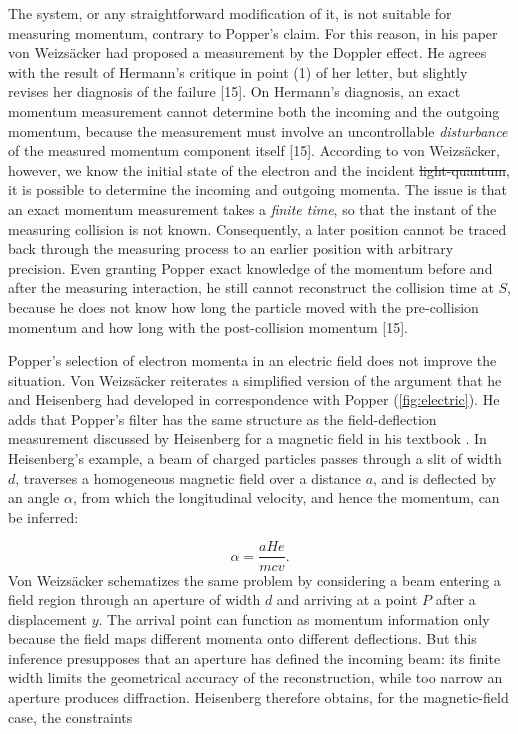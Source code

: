 \documentclass[pdflatex]{sn-jnl}
\newcommand{\vW}{von Weizsäcker\xspace}
\newcommand{\VW}{Von Weizsäcker\xspace}
\providecommand{\DIFadd}[1]{{\protect\color{blue}\uwave{#1}}} %
\providecommand{\DIFdel}[1]{{\protect\color{red}\sout{#1}}}                      %
\providecommand{\DIFaddbegin}{} %
\providecommand{\DIFaddend}{} %
\providecommand{\DIFdelbegin}{} %
\providecommand{\DIFdelend}{} %
\begin{document}
The system, or any straightforward modification of it, is not suitable for measuring momentum, contrary to Popper's claim. For this reason, in his paper \vW had proposed a measurement by the Doppler effect. He agrees with the result of Hermann's critique in point (1) of her letter, but slightly revises her diagnosis of the failure [15]. On Hermann's diagnosis, an exact momentum measurement cannot determine both the incoming and the outgoing momentum, because the measurement must involve an uncontrollable \emph{disturbance} of the measured momentum component itself [15]. According to \vW, however, \DIFaddbegin \DIFadd{if }\DIFaddend we know the initial state of the electron and the incident \DIFdelbegin \DIFdel{light-quantum}\DIFdelend \DIFaddbegin \DIFadd{light quantum}\DIFaddend , it is possible to determine the incoming and outgoing momenta. The issue is that an exact momentum measurement takes a \emph{finite time}, so that the instant of the measuring collision is not known. Consequently, a later position cannot be traced back through the measuring process to an earlier position with arbitrary precision. Even granting Popper exact knowledge of the momentum before and after the measuring interaction, he still cannot reconstruct the collision time at $S$, because he does not know how long the particle moved with the pre-collision momentum and how long with the post-collision momentum [15].



Popper's selection of electron momenta in an electric field does not improve the situation. \VW reiterates a simplified version of the argument that he and Heisenberg had developed in correspondence with Popper (\cref{fig:electric}). He adds that Popper's filter has the same structure as the field-deflection measurement discussed by Heisenberg for a magnetic field in his textbook \citep[21]{Heisenberg1930}. In Heisenberg's example, a beam of charged particles passes through a slit of width $d$, traverses a homogeneous magnetic field over a distance $a$, and is deflected by an angle $\alpha$, from which the longitudinal velocity, and hence the momentum, can be inferred:

\begin{equation*}
\alpha=\frac{aHe}{mcv}.
\end{equation*}
%
\VW schematizes the same problem by considering a beam entering a field region through an aperture of width $d$ and arriving at a point $P$ after a displacement $y$. The arrival point can function as momentum information only because the field maps different momenta onto different deflections. But this inference presupposes that an aperture has defined the incoming beam: its finite width limits the geometrical accuracy of the reconstruction, while too narrow an aperture produces diffraction. Heisenberg therefore obtains, for the magnetic-field case, the constraints
\end{document}
